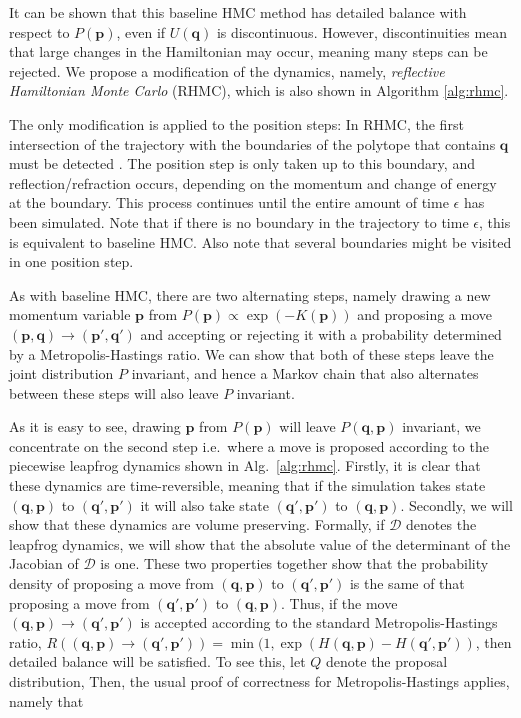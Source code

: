\documentclass{article} %
\newcommand{\bvec}[1]{\textbf{#1}}
\begin{document}
It can be shown that this baseline HMC method has detailed balance with respect to $P(\bvec{p})$, even if $U(\bvec{q})$ is discontinuous.  However, discontinuities mean that large changes in the Hamiltonian may occur, meaning many steps can be rejected.  We propose a modification of the dynamics, namely, \emph{reflective Hamiltonian Monte Carlo} (RHMC), which is also shown in Algorithm \ref{alg:rhmc}.  

The only modification is applied to the position steps: In RHMC, the first intersection of the trajectory with the boundaries of the polytope that contains $\bvec{q}$ must be detected \cite{pakman2014exact, pakman2013auxiliary}.  The position step is only taken up to this boundary, and reflection/refraction occurs, depending on the momentum and change of energy at the boundary.  This process continues until the entire amount of time $\epsilon$ has been simulated.  Note that if there is no boundary in the trajectory to time $\epsilon$, this is equivalent to baseline HMC.  Also note that several boundaries might be visited in one position step.

As with baseline HMC, there are two alternating steps, namely drawing a new momentum
variable $\bvec{p}$ from $P(\bvec{p})\propto\exp(-K(\bvec{p}))$ and proposing a move
$(\bvec{p}, \bvec{q})\rightarrow(\bvec{p}', \bvec{q}')$ and accepting or rejecting it with a probability
determined by a Metropolis-Hastings ratio. We can show that both of
these steps leave the joint distribution $P$ invariant, and hence
a Markov chain that also alternates between these steps will also
leave $P$ invariant.

As it is easy to see, drawing $\bvec{p}$ from $P(\bvec{p})$ will leave $P(\bvec{q}, \bvec{p})$
invariant, we concentrate on the second step i.e.\ where a move is proposed
according to the piecewise leapfrog dynamics shown in Alg.~\ref{alg:rhmc}. 
Firstly, it is clear that these dynamics are time-reversible,
meaning that if the simulation takes state $(\bvec{q}, \bvec{p})$ to $(\bvec{q}', \bvec{p}')$
it will also take state $(\bvec{q}', \bvec{p}')$ to $(\bvec{q}, \bvec{p})$. Secondly, we will
show that these dynamics are volume preserving. Formally, if $\mathcal{D}$
denotes the leapfrog dynamics, we will show that the absolute value
of the determinant of the Jacobian of $\mathcal{D}$ is one. These
two properties together show that the probability density of proposing
a move from $(\bvec{q}, \bvec{p})$ to $(\bvec{q}', \bvec{p}')$ is the same of that proposing a
move from $(\bvec{q}', \bvec{p}')$ to $(\bvec{q}, \bvec{p})$. Thus, if the move $(\bvec{q}, \bvec{p})\rightarrow(\bvec{q}', \bvec{p}')$
is accepted according to the standard Metropolis-Hastings ratio, $R\left((\bvec{q}, \bvec{p})\rightarrow(\bvec{q}', \bvec{p}')\right) = \min(1,\exp(H(\bvec{q}, \bvec{p})-H(\bvec{q}', \bvec{p}'))$,
then detailed balance will be satisfied. To see this, let $Q$ denote
the proposal distribution, Then, the usual proof of correctness for Metropolis-Hastings applies, namely that
\end{document}
